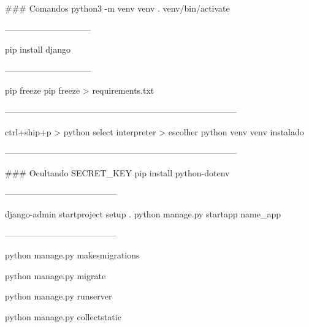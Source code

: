 ### Comandos
python3 -m venv venv
. venv/bin/activate

------------------------------

pip install django

------------------------------

pip freeze
pip freeze > requirements.txt

---------------------------------------------------------------------------------

ctrl+ship+p > python select interpreter > escolher python venv venv instalado

---------------------------------------------------------------------------------

### Ocultando SECRET_KEY
pip install python-dotenv

---------------------------------------

django-admin startproject setup .
python manage.py startapp name_app

---------------------------------------

python manage.py makesmigrations

python manage.py migrate

python manage.py runserver

python manage.py collectstatic